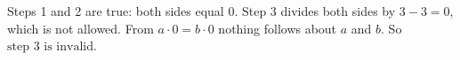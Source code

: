 Steps 1 and 2 are true: both sides equal $0$. Step 3 divides both sides by $3-3=0$, which is not allowed. From $a\cdot0=b\cdot0$ nothing follows about $a$ and $b$. So $\boxed{\text{step }3\text{ is invalid}}$.
